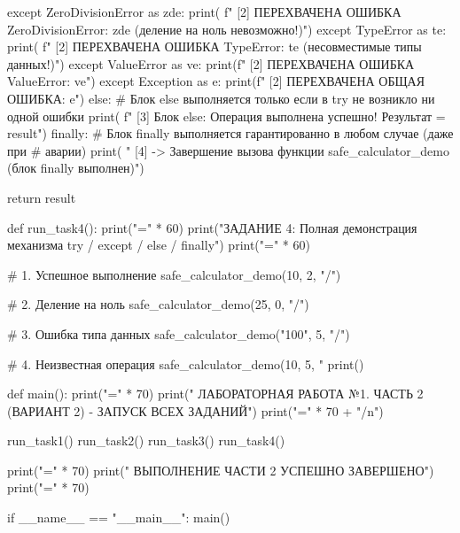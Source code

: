 \documentclass[14pt,a4paper]{extarticle}
\begin{document}
\begin{CodeListing}
    except ZeroDivisionError as zde:
        print(
            f"  [2] ПЕРЕХВАЧЕНА ОШИБКА ZeroDivisionError: {zde} (деление на ноль невозможно!)")
    except TypeError as te:
        print(
            f"  [2] ПЕРЕХВАЧЕНА ОШИБКА TypeError: {te} (несовместимые типы данных!)")
    except ValueError as ve:
        print(f"  [2] ПЕРЕХВАЧЕНА ОШИБКА ValueError: {ve}")
    except Exception as e:
        print(f"  [2] ПЕРЕХВАЧЕНА ОБЩАЯ ОШИБКА: {e}")
    else:
        # Блок else выполняется только если в try не возникло ни одной ошибки
        print(
            f"  [3] Блок else: Операция выполнена успешно! Результат = {result}")
    finally:
        # Блок finally выполняется гарантированно в любом случае (даже при
        # аварии)
        print(
            "  [4] -> Завершение вызова функции safe_calculator_demo (блок finally выполнен)")

    return result


def run_task4():
    print("=" * 60)
    print("ЗАДАНИЕ 4: Полная демонстрация механизма try / except / else / finally")
    print("=" * 60)

    # 1. Успешное выполнение
    safe_calculator_demo(10, 2, "/")

    # 2. Деление на ноль
    safe_calculator_demo(25, 0, "/")

    # 3. Ошибка типа данных
    safe_calculator_demo("100", 5, "/")

    # 4. Неизвестная операция
    safe_calculator_demo(10, 5, "%
    print()


def main():
    print("=" * 70)
    print("  ЛАБОРАТОРНАЯ РАБОТА №1. ЧАСТЬ 2 (ВАРИАНТ 2) - ЗАПУСК ВСЕХ ЗАДАНИЙ")
    print("=" * 70 + "/n")

    run_task1()
    run_task2()
    run_task3()
    run_task4()

    print("=" * 70)
    print("  ВЫПОЛНЕНИЕ ЧАСТИ 2 УСПЕШНО ЗАВЕРШЕНО")
    print("=" * 70)


if __name__ == "__main__":
    main()
\end{CodeListing}
\end{document}
